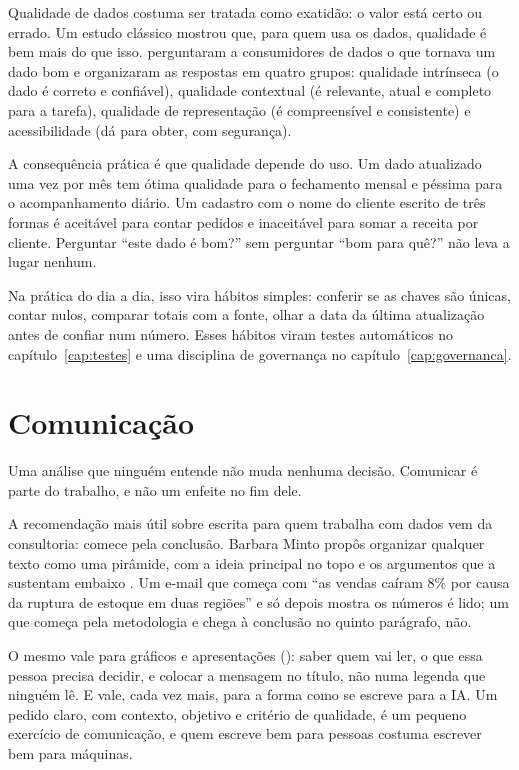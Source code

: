 Qualidade de dados costuma ser tratada como exatidão: o valor está certo ou errado. Um
estudo clássico mostrou que, para quem usa os dados, qualidade é bem mais do que isso.
\textcite{wang1996} perguntaram a consumidores de dados o que tornava um dado bom e
organizaram as respostas em quatro grupos: qualidade intrínseca (o dado é correto e
confiável), qualidade contextual (é relevante, atual e completo para a tarefa), qualidade
de representação (é compreensível e consistente) e acessibilidade (dá para obter, com
segurança).

A consequência prática é que qualidade depende do uso. Um dado atualizado uma vez por mês
tem ótima qualidade para o fechamento mensal e péssima para o acompanhamento diário. Um
cadastro com o nome do cliente escrito de três formas é aceitável para contar pedidos e
inaceitável para somar a receita por cliente. Perguntar \enquote{este dado é bom?} sem
perguntar \enquote{bom para quê?} não leva a lugar nenhum.

Na prática do dia a dia, isso vira hábitos simples: conferir se as chaves são únicas,
contar nulos, comparar totais com a fonte, olhar a data da última atualização antes de
confiar num número. Esses hábitos viram testes automáticos no capítulo~\ref{cap:testes} e
uma disciplina de governança no capítulo~\ref{cap:governanca}.

\section{Comunicação}
\label{sec:fund-comunicacao}

Uma análise que ninguém entende não muda nenhuma decisão. Comunicar é parte do trabalho, e
não um enfeite no fim dele.

A recomendação mais útil sobre escrita para quem trabalha com dados vem da consultoria:
comece pela conclusão. Barbara Minto propôs organizar qualquer texto como uma pirâmide,
com a ideia principal no topo e os argumentos que a sustentam embaixo
\parencite{minto2009}. Um e-mail que começa com \enquote{as vendas caíram 8\% por causa da
ruptura de estoque em duas regiões} e só depois mostra os números é lido; um que começa
pela metodologia e chega à conclusão no quinto parágrafo, não.

O mesmo vale para gráficos e apresentações (): saber quem vai ler,
o que essa pessoa precisa decidir, e colocar a mensagem no título, não numa legenda que
ninguém lê. E vale, cada vez mais, para a forma como se escreve para a IA. Um pedido claro,
com contexto, objetivo e critério de qualidade, é um pequeno exercício de comunicação, e
quem escreve bem para pessoas costuma escrever bem para máquinas.

